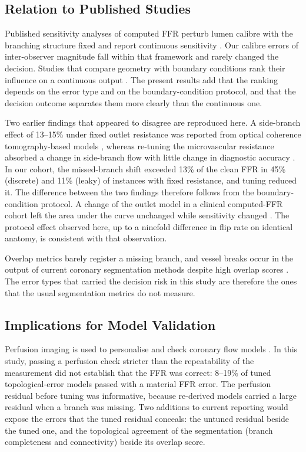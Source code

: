 \documentclass[journal]{IEEEtran}
\begin{document}
\subsection{Relation to Published Studies}
Published sensitivity analyses of computed FFR perturb lumen calibre with the branching structure fixed and report
continuous sensitivity \cite{sankaran2015tmi,sankaran2015cmame,fernandez2024,dalmaso2025}. Our calibre errors of
inter-observer magnitude fall within that framework and rarely changed the decision. Studies that compare geometry with boundary conditions rank their influence on a continuous output
\cite{sankaran2016,tanade2022,korte2023}. The present results add that the ranking depends on the error type and on
the boundary-condition protocol, and that the decision outcome separates them more clearly than the continuous
one.

Two earlier findings that appeared to disagree are reproduced here. A side-branch effect of 13--15\% under
fixed outlet resistance was reported from optical coherence tomography-based models \cite{gamage2022}, whereas
re-tuning the microvascular resistance absorbed a change in side-branch flow with little change in diagnostic
accuracy \cite{gosling2020}. In our cohort, the missed-branch shift exceeded 13\% of the clean FFR in 45\%
(discrete) and 11\% (leaky) of instances with fixed resistance, and tuning reduced it. The difference between the
two findings therefore follows from the boundary-condition protocol. A change of
the outlet model in a clinical computed-FFR cohort left the area under the curve unchanged while sensitivity
changed \cite{fossan2026}. The protocol effect observed here, up to a ninefold difference in flip rate on identical
anatomy, is consistent with that observation.

Overlap metrics barely register a missing branch, and vessel breaks occur in the output of current coronary
segmentation methods despite high overlap scores \cite{bransby2026}. The error types that carried the decision risk
in this study are therefore the ones that the usual segmentation metrics do not measure.

\subsection{Implications for Model Validation}
Perfusion imaging is used to personalise and check coronary flow models \cite{menon2024}. In this study, passing a
perfusion check stricter than the repeatability of the measurement did not establish that the FFR was correct:
8--19\% of tuned topological-error models passed with a material FFR error. The perfusion residual before tuning
was informative, because re-derived models carried a large residual when a branch was missing. Two additions to
current reporting would expose the errors that the tuned residual conceals: the untuned residual beside the tuned
one, and the topological agreement of the segmentation (branch completeness and connectivity) beside its overlap
score.
\end{document}
